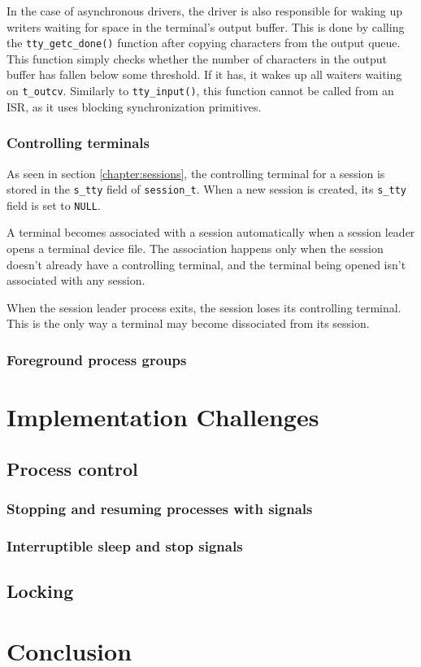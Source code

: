 \documentclass[shortabstract, manyadvisors, english, mgr]{iithesis}
\begin{document}
In the case of asynchronous drivers, the driver is also responsible for waking
up writers waiting for space in the terminal's output buffer. This is done by
calling the \texttt{tty\_getc\_done()} function after copying characters from
the output queue. This function simply checks whether the number of characters
in the output buffer has fallen below some threshold. If it has, it wakes up all
waiters waiting on \texttt{t\_outcv}. Similarly to \texttt{tty\_input()}, this
function cannot be called from an ISR, as it uses blocking synchronization
primitives.

\subsection{Controlling terminals}

As seen in section \ref{chapter:sessions}, the controlling terminal for a
session is stored in the \texttt{s\_tty} field of \texttt{session\_t}. When a
new session is created, its \texttt{s\_tty} field is set to \texttt{NULL}.

A terminal becomes associated with a session automatically when a session leader
opens a terminal device file. The association happens only when the session
doesn't already have a controlling terminal, and the terminal being opened isn't
associated with any session.

When the session leader process exits, the session loses its controlling
terminal. This is the only way a terminal may become dissociated from its
session.

\subsection{Foreground process groups}
\chapter{Implementation Challenges}
\section{Process control}
\subsection{Stopping and resuming processes with signals}
\subsection{Interruptible sleep and stop signals}
\section{Locking}
\chapter{Conclusion}



\end{document}
